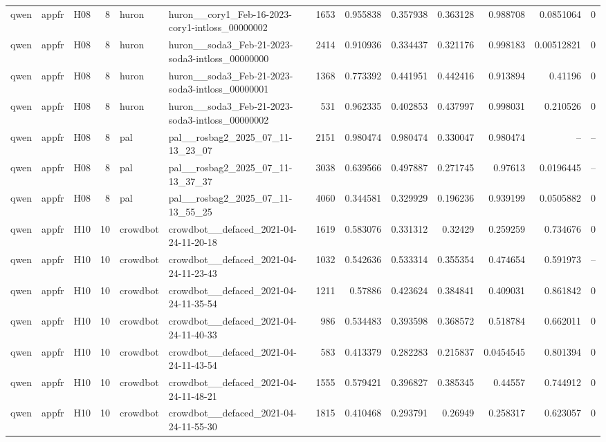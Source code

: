\begin{longtable}{lllrllrrrrrrr}
qwen & appfr & H08 & 8 & huron & huron\_\_cory1\_Feb-16-2023-cory1-intloss\_00000002 & 1653 & 0.955838 & 0.357938 & 0.363128 & 0.988708 & 0.0851064 & 0 \\
qwen & appfr & H08 & 8 & huron & huron\_\_soda3\_Feb-21-2023-soda3-intloss\_00000000 & 2414 & 0.910936 & 0.334437 & 0.321176 & 0.998183 & 0.00512821 & 0 \\
qwen & appfr & H08 & 8 & huron & huron\_\_soda3\_Feb-21-2023-soda3-intloss\_00000001 & 1368 & 0.773392 & 0.441951 & 0.442416 & 0.913894 & 0.41196 & 0 \\
qwen & appfr & H08 & 8 & huron & huron\_\_soda3\_Feb-21-2023-soda3-intloss\_00000002 & 531 & 0.962335 & 0.402853 & 0.437997 & 0.998031 & 0.210526 & 0 \\
qwen & appfr & H08 & 8 & pal & pal\_\_rosbag2\_2025\_07\_11-13\_23\_07 & 2151 & 0.980474 & 0.980474 & 0.330047 & 0.980474 & -- & -- \\
qwen & appfr & H08 & 8 & pal & pal\_\_rosbag2\_2025\_07\_11-13\_37\_37 & 3038 & 0.639566 & 0.497887 & 0.271745 & 0.97613 & 0.0196445 & -- \\
qwen & appfr & H08 & 8 & pal & pal\_\_rosbag2\_2025\_07\_11-13\_55\_25 & 4060 & 0.344581 & 0.329929 & 0.196236 & 0.939199 & 0.0505882 & 0 \\
qwen & appfr & H10 & 10 & crowdbot & crowdbot\_\_defaced\_2021-04-24-11-20-18 & 1619 & 0.583076 & 0.331312 & 0.32429 & 0.259259 & 0.734676 & 0 \\
qwen & appfr & H10 & 10 & crowdbot & crowdbot\_\_defaced\_2021-04-24-11-23-43 & 1032 & 0.542636 & 0.533314 & 0.355354 & 0.474654 & 0.591973 & -- \\
qwen & appfr & H10 & 10 & crowdbot & crowdbot\_\_defaced\_2021-04-24-11-35-54 & 1211 & 0.57886 & 0.423624 & 0.384841 & 0.409031 & 0.861842 & 0 \\
qwen & appfr & H10 & 10 & crowdbot & crowdbot\_\_defaced\_2021-04-24-11-40-33 & 986 & 0.534483 & 0.393598 & 0.368572 & 0.518784 & 0.662011 & 0 \\
qwen & appfr & H10 & 10 & crowdbot & crowdbot\_\_defaced\_2021-04-24-11-43-54 & 583 & 0.413379 & 0.282283 & 0.215837 & 0.0454545 & 0.801394 & 0 \\
qwen & appfr & H10 & 10 & crowdbot & crowdbot\_\_defaced\_2021-04-24-11-48-21 & 1555 & 0.579421 & 0.396827 & 0.385345 & 0.44557 & 0.744912 & 0 \\
qwen & appfr & H10 & 10 & crowdbot & crowdbot\_\_defaced\_2021-04-24-11-55-30 & 1815 & 0.410468 & 0.293791 & 0.26949 & 0.258317 & 0.623057 & 0 \\

\end{longtable}
